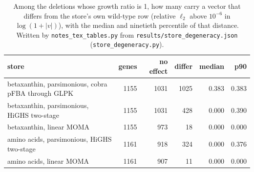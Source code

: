 \begin{table}[H]
  \centering
  \footnotesize
  \caption[Degeneracy of the target stores]{Among the deletions whose growth ratio is 1, how many carry a vector that differs from the store's own wild-type row (relative $\ell_2$ above $10^{-6}$ in $\log(1+|v|)$), with the median and ninetieth percentile of that distance. Written by \texttt{notes\_tex\_tables.py} from \texttt{results/store\_degeneracy.json} (\texttt{store\_degeneracy.py}).}
  \label{tab:store-degeneracy}
  \begin{tabular}{@{}lrrrrr@{}}
    \hline
    store & genes & no effect & differ & median & p90 \\
    \hline
    betaxanthin, parsimonious, cobra pFBA through GLPK & 1155 & 1031 & 1025 & 0.383 & 0.383 \\
    betaxanthin, parsimonious, HiGHS two-stage & 1155 & 1031 & 428 & 0.000 & 0.390 \\
    betaxanthin, linear MOMA & 1155 & 973 & 18 & 0.000 & 0.000 \\
    amino acids, parsimonious, HiGHS two-stage & 1161 & 918 & 324 & 0.000 & 0.376 \\
    amino acids, linear MOMA & 1161 & 907 & 11 & 0.000 & 0.000 \\
    \hline
  \end{tabular}
\end{table}
